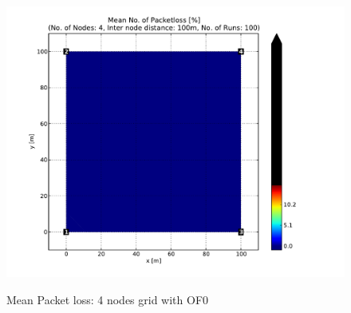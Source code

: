 \begin{figure}[htbp]
{      \hspace{-30pt}
      \includegraphics[scale=0.23]{Pics/results/4/OF0/grid/dist100_montecarlo_contour_packetloss.pdf}}
  \caption{Mean Packet loss: 4 nodes grid with OF0}
 \label{fig:pl_4_grid_of0}
\end{figure}

